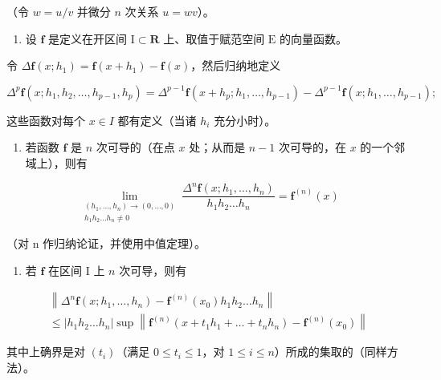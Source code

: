 （令 \(w = u / v\) 并微分 \(n\) 次关系 \(u = wv\)）。

\begin{enumerate}
\def\labelenumi{\arabic{enumi})}
\setcounter{enumi}{5}
\tightlist
\item
  设 \(\mathbf{f}\) 是定义在开区间 \(\mathrm{I} \subset \mathbf{R}\) 上、取值于赋范空间 \(\mathrm{E}\) 的向量函数。
\end{enumerate}

令 \(\Delta \mathbf{f}(x; h_1) = \mathbf{f}(x + h_1) - \mathbf{f}(x)\)，然后归纳地定义

\[
\Delta^ {p} \mathbf {f} (x; h _ {1}, h _ {2}, \dots , h _ {p - 1}, h _ {p}) = \Delta^ {p - 1} \mathbf {f} (x + h _ {p}; h _ {1}, \dots , h _ {p - 1}) - \Delta^ {p - 1} \mathbf {f} (x; h _ {1}, \dots , h _ {p - 1});
\]

这些函数对每个 \(x \in I\) 都有定义（当诸 \(h_{i}\) 充分小时）。

\begin{enumerate}
\def\labelenumi{\alph{enumi})}
\tightlist
\item
  若函数 \(\mathbf{f}\) 是 \(n\) 次可导的（在点 \(x\) 处；从而是 \(n - 1\) 次可导的，在 \(x\) 的一个邻域上），则有
\end{enumerate}

\[
\lim_{\substack{(h_{1},\ldots ,h_{n})\to (0,\ldots ,0)\\ h_{1}h_{2}\ldots h_{n}\neq 0}}\frac{\varDelta^{n}\mathbf{f}(x;h_{1},\ldots,h_{n})}{h_{1}h_{2}\ldots h_{n}} = \mathbf{f}^{(n)}(x)
\]

（对 n 作归纳论证，并使用中值定理）。

\begin{enumerate}
\def\labelenumi{\alph{enumi})}
\setcounter{enumi}{1}
\tightlist
\item
  若 \(\mathbf{f}\) 在区间 I 上 \(n\) 次可导，则有
\end{enumerate}

\[
\begin{array}{l} \left\| \Delta^ {n} \mathbf {f} (x; h _ {1}, \ldots , h _ {n}) - \mathbf {f} ^ {(n)} (x _ {0}) h _ {1} h _ {2} \ldots h _ {n} \right\| \\ \leqslant | h _ {1} h _ {2} \ldots h _ {n} | \sup \left\| \mathbf {f} ^ {(n)} (x + t _ {1} h _ {1} + \dots + t _ {n} h _ {n}) - \mathbf {f} ^ {(n)} (x _ {0}) \right\| \end{array}
\]

其中上确界是对 \((t_i)\)（满足 \(0 \leqslant t_i \leqslant 1\)，对 \(1 \leqslant i \leqslant n\)）所成的集取的（同样方法）。

